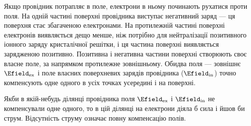 Якщо провідник потрапляє в поле, електрони в ньому починають рухатися проти поля.
На одній частині поверхні провідника виступає негативний заряд --- ця поверхня стає
збагаченою електронами. На протилежній частині поверхні
електронів виявляється дещо менше, ніж потрібно для нейтралізації позитивного
іонного заряду кристалічної решітки, і ця частина поверхні виявляється зарядженою
позитивно. Позитивна і негативна частини поверхні створюють своє власне поле, за
напрямком протилежне зовнішньому. Обидва поля --- зовнішнє $\Efield_\text{ex}$ і
поле власних     поверхневих зарядів провідника ($\Efield_\text{in}$) точно
компенсують одне одного в усіх точках усередині і на поверхні.

Якби в якій-небудь ділянці провідника поля $\Efield_\text{ex}$ і $\Efield_\text{in}$
не компенсували одне одного, то в цій ділянці на електрони діяла б сила і йшов би
струм. Відсутність струму означає повну компенсацію полів.


